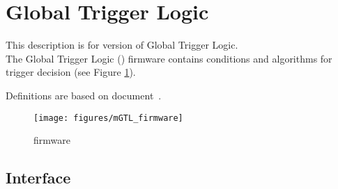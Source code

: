 \section{Global Trigger Logic}
\label{sec:gtl:global_trigger_logic}

This description is for version \versiongtl of Global Trigger Logic.\\

The Global Trigger Logic (\ugtl) firmware contains conditions and algorithms for trigger decision (see Figure \ref{fig:gtl:mGTL_firmware}).

Definitions are based on document~\cite{interface}.

\begin{figure}[htb]
\centering
\texttt{[image: figures/mGTL\_firmware]}
\caption{\ugtl firmware}
\label{fig:gtl:mGTL_firmware}
\end{figure}

\subsection{\ugtl Interface}
\label{sec:gtl:ugtl_interface}

